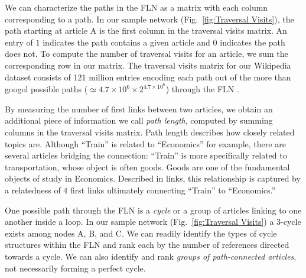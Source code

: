 \documentclass[pre,twocolumn,twoside,superscriptaddress,floatfix]{revtex4-1}
\begin{document}
{We can characterize the paths in the FLN as a matrix with each column corresponding to a path. In our sample network 
(Fig.~\ref{fig:Traversal Visits}), the path starting at article A is the 
first column in the traversal visits matrix. 
An entry of $1$ indicates the path contains a given article and 
$0$ indicates the path does not.
To compute the number of traversal visits for an article, we sum the corresponding row in our matrix.
The traversal visits matrix for 
our Wikipedia dataset consists of 121 million entries encoding each path out of the more than 
googol possible paths ($\simeq4.7\times10^6\times2^{4.7\times10^6}$) through the FLN .

By measuring the number of first links between
two articles, we obtain an additional piece of information we call 
{\it path length}, computed by summing 
columns in the traversal visits matrix. 
Path length describes how closely related topics are.
Although ``Train'' is related to ``Economics'' for example, there are several articles
bridging the connection:
``Train'' is more specifically related to transportation, whose object
is often goods. Goods are one of the fundamental objects of study in Economics.
Described in links, this relationship is captured by a relatedness of $4$ 
first links ultimately connecting ``Train'' to ``Economics.'' 

One possible path through the FLN is a {\it cycle} or a group of articles 
linking to one another inside a loop. In our sample network 
(Fig.~\ref{fig:Traversal Visits}) 
a 3-cycle exists among nodes A, B, and C. 
We can readily identify
the types of cycle structures within the FLN
and rank each by 
the number of references directed towards a cycle. 
We can also identify and rank {\it groups of 
path-connected articles}, not necessarily forming a perfect cycle.

}
\end{document}
